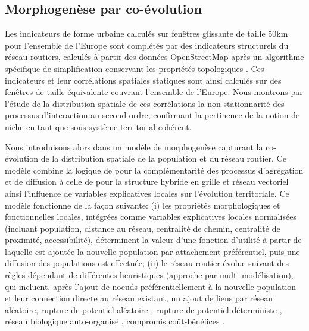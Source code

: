 \documentclass[11pt]{article}
\begin{document}
\subsection{Morphogenèse par co-évolution}


Les indicateurs de forme urbaine calculés sur fenêtres glissante de taille 50km pour l'ensemble de l'Europe sont complétés par des indicateurs structurels du réseau routiers, calculés à partir des données OpenStreetMap après un algorithme spécifique de simplification conservant les propriétés topologiques \citep{raimbault2018urban}. Ces indicateurs et leur corrélations spatiales statiques sont ainsi calculés sur des fenêtres de taille équivalente couvrant l'ensemble de l'Europe. Nous montrons par l'étude de la distribution spatiale de ces corrélations la non-stationnarité des processus d'interaction au second ordre, confirmant la pertinence de la notion de niche en tant que sous-système territorial cohérent.

Nous introduisons alors dans \cite{raimbault2018urban} un modèle de morphogenèse capturant la co-évolution de la distribution spatiale de la population et du réseau routier. Ce modèle combine la logique de \cite{raimbault2018calibration} pour la complémentarité des processus d'agrégation et de diffusion à celle de \cite{raimbault2014hybrid} pour la structure hybride en grille et réseau vectoriel ainsi l'influence de variables explicatives locales sur l'évolution territoriale. Ce modèle fonctionne de la façon suivante: (i) les propriétés morphologiques et fonctionnelles locales, intégrées comme variables explicatives locales normalisées (incluant population, distance au réseau, centralité de chemin, centralité de proximité, accessibilité), déterminent la valeur d'une fonction d'utilité à partir de laquelle est ajoutée la nouvelle population par attachement préférentiel, puis une diffusion des populations est effectuée; (ii) le réseau routier évolue suivant des règles dépendant de différentes heuristiques (approche par multi-modélisation), qui incluent, après l'ajout de noeuds préférentiellement à la nouvelle population et leur connection directe au réseau existant, un ajout de liens par réseau aléatoire, rupture de potentiel aléatoire \citep{schmitt2014modelisation}, rupture de potentiel déterministe \citep{raimbault2016generation}, réseau biologique auto-organisé \citep{tero2010rules}, compromis coût-bénéfices \citep{louf2013emergence}.
\end{document}
